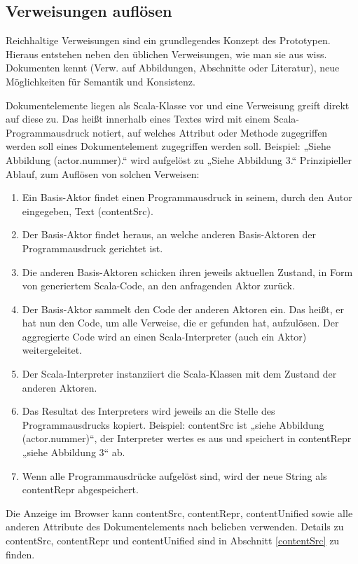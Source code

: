 \subsection{Verweisungen auflösen}\label{verweise-aufloesen}
 
Reichhaltige Verweisungen sind ein grundlegendes Konzept des Prototypen. Hieraus entstehen neben den üblichen Verweisungen, wie man sie aus wiss. Dokumenten kennt (Verw. auf Abbildungen, Abschnitte oder Literatur), neue Möglichkeiten für Semantik und Konsistenz.

 
Dokumentelemente liegen als Scala-Klasse vor und eine Verweisung greift direkt auf diese zu. Das heißt innerhalb eines Textes wird mit einem Scala-Programmausdruck notiert, auf welches Attribut oder Methode zugegriffen werden soll eines Dokumentelement zugegriffen werden soll. Beispiel: „Siehe Abbildung (actor.nummer).“ wird aufgelöst zu „Siehe Abbildung 3.“ Prinzipieller Ablauf, zum Auflösen von solchen Verweisen:

 
\begin{enumerate}

\item Ein Basis-Aktor findet einen Programmausdruck in seinem, durch den Autor eingegeben, Text (contentSrc).
\item Der Basis-Aktor findet heraus, an welche anderen Basis-Aktoren der Programmausdruck gerichtet ist.
\item Die anderen Basis-Aktoren schicken ihren jeweils aktuellen Zustand, in Form von generiertem Scala-Code, an den anfragenden Aktor zurück.
\item Der Basis-Aktor sammelt den Code der anderen Aktoren ein. Das heißt, er hat nun den Code, um alle Verweise, die er gefunden hat, aufzulösen. Der aggregierte Code wird an einen Scala-Interpreter (auch ein Aktor) weitergeleitet.
\item Der Scala-Interpreter instanziiert die Scala-Klassen mit dem Zustand der anderen Aktoren.
\item Das Resultat des Interpreters wird jeweils an die Stelle des Programmausdrucks kopiert. Beispiel: contentSrc ist „siehe Abbildung (actor.nummer)“, der Interpreter wertes es aus und speichert in contentRepr „siehe Abbildung 3“ ab.
\item Wenn alle Programmausdrücke aufgelöst sind, wird der neue String als contentRepr abgespeichert.
\end{enumerate}
 
Die Anzeige im Browser kann contentSrc, contentRepr, contentUnified sowie alle anderen Attribute des Dokumentelements nach belieben verwenden. Details zu contentSrc, contentRepr und contentUnified sind in Abschnitt \ref{contentSrc} zu finden.

